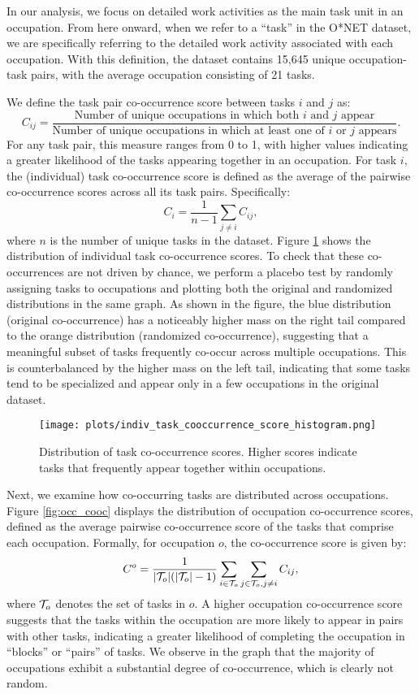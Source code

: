 \documentclass{article}
\theoremstyle{plain}
\theoremstyle{plain}
\begin{document}
In our analysis, we focus on detailed work activities as the main task unit in an occupation. 
From here onward, when we refer to a “task” in the O*NET dataset, we are specifically referring to the detailed work activity associated with each occupation. 
With this definition, the dataset contains 15,645 unique occupation-task pairs, with the average occupation consisting of 21 tasks.

We define the task pair co-occurrence score between tasks $i$ and $j$  as:
$$C_{ij} = \frac{\text{Number of unique occupations in which both $i$ and $j$ appear}}{\text{Number of unique occupations in which at least one of $i$ or $j$ appears}}.$$
For any task pair, this measure ranges from 0 to 1, with higher values indicating a greater likelihood of the tasks appearing together in an occupation.
For task $i$, the (individual) task co-occurrence score is defined as the average of the pairwise co-occurrence scores across all its task pairs. Specifically:
$$C_{i}=\frac{1}{n-1}\sum_{j\neq i}C_{ij},$$ 
where $n$ is the number of unique tasks in the dataset.
Figure \ref{fig:task_cooc} shows the distribution of individual task co-occurrence scores. 
To check that these co-occurrences are not driven by chance, we perform a placebo test by randomly assigning tasks to occupations and plotting both the original and randomized distributions in the same graph. 
As shown in the figure, the blue distribution (original co-occurrence) has a noticeably higher mass on the right tail compared to the orange distribution (randomized co-occurrence), suggesting that a meaningful subset of tasks frequently co-occur across multiple occupations. 
This is counterbalanced by the higher mass on the left tail, indicating that some tasks tend to be specialized and appear only in a few occupations in the original dataset.

\begin{figure}[htbp]
  \centering
  \texttt{[image: plots/indiv\_task\_cooccurrence\_score\_histogram.png]}
  \caption{Distribution of task co-occurrence scores. Higher scores indicate tasks that frequently appear together within occupations.}
  \label{fig:task_cooc}
\end{figure}

Next, we examine how co-occurring tasks are distributed across occupations. 
Figure \ref{fig:occ_cooc} displays the distribution of occupation co-occurrence scores, defined as the average pairwise co-occurrence score of the tasks that comprise each occupation.
Formally, for occupation $o$, the co-occurrence score is given by:
$$C^o=\frac{1}{|\mathcal{T}_o| ( |\mathcal{T}_o|-1)} \sum_{i\in\mathcal{T}_o} \sum_{j\in\mathcal{T}_o,j\neq i} C_{ij},$$
where $\mathcal{T}_o$ denotes the set of tasks in $o$. 
A higher occupation co-occurrence score suggests that the tasks within the occupation are more likely to appear in pairs with other tasks, indicating a greater likelihood of completing the occupation in “blocks” or “pairs” of tasks. 
We observe in the graph that the majority of occupations exhibit a substantial degree of co-occurrence, which is clearly not random.
\end{document}
